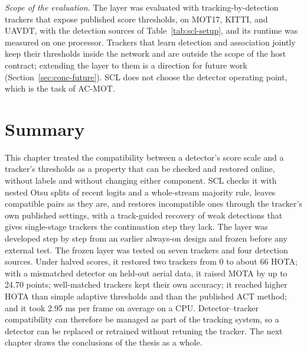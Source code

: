 \emph{Scope of the evaluation.} The layer was evaluated with tracking-by-detection trackers that expose published score thresholds, on MOT17, KITTI, and UAVDT, with the detection sources of Table~\ref{tab:scl-setup}, and its runtime was measured on one processor. Trackers that learn detection and association jointly keep their thresholds inside the network and are outside the scope of the host contract; extending the layer to them is a direction for future work (Section~\ref{sec:conc-future}). SCL does not choose the detector operating point, which is the task of AC-MOT.

\section{Summary}\label{sec:scl-summary}
This chapter treated the compatibility between a detector's score scale and a tracker's thresholds as a property that can be checked and restored online, without labels and without changing either component. SCL checks it with nested Otsu splits of recent logits and a whole-stream majority rule, leaves compatible pairs as they are, and restores incompatible ones through the tracker's own published settings, with a track-guided recovery of weak detections that gives single-stage trackers the continuation step they lack. The layer was developed step by step from an earlier always-on design and frozen before any external test. The frozen layer was tested on seven trackers and four detection sources. Under halved scores, it restored two trackers from 0 to about 66 HOTA; with a mismatched detector on held-out aerial data, it raised MOTA by up to 24.70 points; well-matched trackers kept their own accuracy; it reached higher HOTA than simple adaptive thresholds and than the published ACT method; and it took 2.95 ms per frame on average on a CPU. Detector--tracker compatibility can therefore be managed as part of the tracking system, so a detector can be replaced or retrained without retuning the tracker. The next chapter draws the conclusions of the thesis as a whole.
